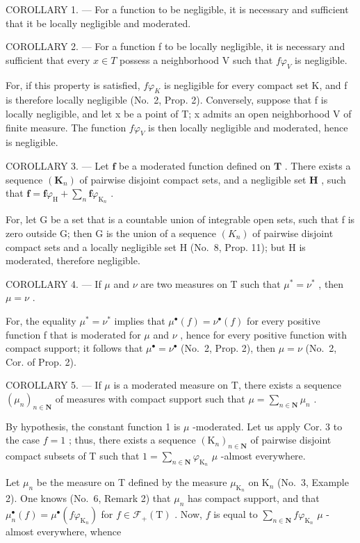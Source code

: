 COROLLARY 1. --- For a function to be negligible, it is necessary and sufficient that it be locally negligible and moderated.

COROLLARY 2. --- For a function f to be locally negligible, it is necessary and sufficient that every \(x \in T\) possess a neighborhood V such that \(f\varphi_{V}\) is negligible.

For, if this property is satisfied, \(f\varphi_{K}\) is negligible for every compact set K, and f is therefore locally negligible (No.~2, Prop. 2). Conversely, suppose that f is locally negligible, and let x be a point of T; x admits an open neighborhood V of finite measure. The function \(f\varphi_{V}\) is then locally negligible and moderated, hence is negligible.

COROLLARY 3. --- Let \(\mathbf{f}\) be a moderated function defined on \(\mathbf{T}\) . There exists a sequence \((\mathbf{K}_n)\) of pairwise disjoint compact sets, and a negligible set \(\mathbf{H}\) , such that \(\mathbf{f} = \mathbf{f}\varphi_{\mathrm{H}} + \sum_{n} \mathbf{f}\varphi_{\mathrm{K}_n}\) .

For, let G be a set that is a countable union of integrable open sets, such that f is zero outside G; then G is the union of a sequence \((K_{n})\) of pairwise disjoint compact sets and a locally negligible set H (No.~8, Prop. 11); but H is moderated, therefore negligible.

COROLLARY 4. --- If \(\mu\) and \(\nu\) are two measures on T such that \(\mu^{*} = \nu^{*}\) , then \(\mu = \nu\) .

For, the equality \(\mu^{*}=\nu^{*}\) implies that \(\mu^{\bullet}(f)=\nu^{\bullet}(f)\) for every positive function f that is moderated for \(\mu\) and \(\nu\) , hence for every positive function with compact support; it follows that \(\mu^{\bullet}=\nu^{\bullet}\) (No.~2, Prop. 2), then \(\mu=\nu\) (No.~2, Cor. of Prop. 2).

COROLLARY 5. --- If \(\mu\) is a moderated measure on T, there exists a sequence \((\mu_n)_{n \in \mathbf{N}}\) of measures with compact support such that \(\mu = \sum_{n \in \mathbf{N}} \mu_n\) .

By hypothesis, the constant function 1 is \(\mu\) -moderated. Let us apply Cor. 3 to the case \(f = 1\) ; thus, there exists a sequence \((\mathrm{K}_n)_{n \in \mathbf{N}}\) of pairwise disjoint compact subsets of T such that \(1 = \sum_{n \in \mathbf{N}} \varphi_{\mathrm{K}_n}\) \(\mu\) -almost everywhere.

Let \(\mu_{n}\) be the measure on T defined by the measure \(\mu_{\mathrm{K}_n}\) on \(\mathrm{K}_n\) (No.~3, Example 2). One knows (No.~6, Remark 2) that \(\mu_{n}\) has compact support, and that \(\mu_n^\bullet (f) = \mu^\bullet (f\varphi_{\mathrm{K}_n})\) for \(f\in \mathcal{F}_{+}(\mathrm{T})\) . Now, \(f\) is equal to \(\sum_{n\in \mathbf{N}}f\varphi_{\mathrm{K}_n}\) \(\mu\) -almost everywhere, whence

